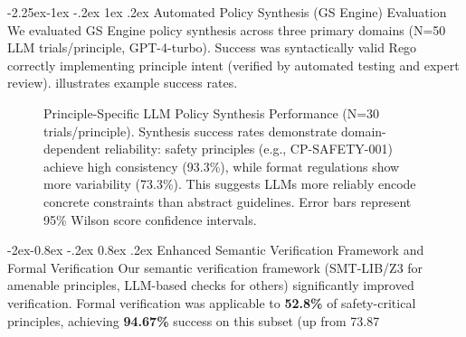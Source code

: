 \documentclass[manuscript,screen,9pt]{acmart}
\makeatletter
\renewcommand\subsection{\@startsection{subsection}{2}{\z@}%
  {-2.25ex\@plus -1ex \@minus -.2ex}%
  {1ex \@plus .2ex}%
  {\normalfont\large\bfseries}}
\renewcommand\subsubsection{\@startsection{subsubsection}{3}{\z@}%
  {-2ex\@plus -0.8ex \@minus -.2ex}%
  {0.8ex \@plus .2ex}%
  {\normalfont\normalsize\bfseries}}
\makeatother
\begin{document}
\subsection{Automated Policy Synthesis (GS Engine) Evaluation}
\label{sec:synthesis_evaluation}
We evaluated GS Engine policy synthesis across three primary domains (N=50 LLM trials/principle, GPT-4-turbo). Success was syntactically valid Rego correctly implementing principle intent (verified by automated testing and expert review).  illustrates example success rates.

\FloatBarrier %
\begin{figure}[!htb]
\centering
\caption[Principle-Specific LLM Policy Synthesis Performance]{Principle-Specific LLM Policy Synthesis Performance (N=30 trials/principle). Synthesis success rates demonstrate domain-dependent reliability: safety principles (e.g., CP-SAFETY-001) achieve high consistency (93.3\%), while format regulations show more variability (73.3\%). This suggests LLMs more reliably encode concrete constraints than abstract guidelines. Error bars represent 95\% Wilson score confidence intervals.}
\label{fig:rule_synthesis_chart}
\end{figure}

\subsubsection{Enhanced Semantic Verification Framework and Formal Verification}
\label{subsubsec:enhanced_verification}
Our semantic verification framework (SMT-LIB/Z3 for amenable principles, LLM-based checks for others) significantly improved verification. Formal verification was applicable to \textbf{52.8\%} of safety-critical principles, achieving \textbf{94.67\%} success on this subset (up from 73.87%
\end{document}
